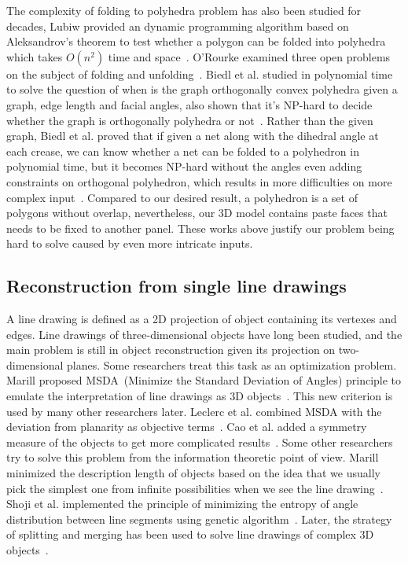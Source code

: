 The complexity of folding to polyhedra problem has also been studied for decades, Lubiw provided an dynamic programming algorithm based on Aleksandrov's theorem to test whether a polygon can be folded into polyhedra which takes $O(n^2)$ time and space~\cite{Lubiw1996When}. 
O'Rourke examined three open problems on the subject of folding and unfolding~\cite{O'Rourke:1998:FUC:646319.686376}. 
Biedl et al. studied in polynomial time to solve the question of when is the graph orthogonally convex polyhedra given a graph, edge length and facial angles, also shown that it's NP-hard to decide whether the graph is orthogonally polyhedra or not~\cite{Biedl2004When}. Rather than the given graph, Biedl et al. proved that if given a net along with the dihedral angle at each crease, we can know whether a net can be folded to a polyhedron in polynomial time, but it becomes NP-hard without the angles even adding constraints on orthogonal polyhedron, which results in more difficulties on more complex input~\cite{Biedl:2005:NFP:1090462.1646553}.
Compared to our desired result, a polyhedron is a set of polygons without overlap, nevertheless, our 3D model contains paste faces that needs to be fixed to another panel. 
These works above justify our problem being hard to solve caused by even more intricate inputs.

\subsection{Reconstruction from single line drawings} 
A line drawing is defined as a 2D projection of object containing its vertexes and edges. Line drawings of three-dimensional objects have long been studied, and the main problem is still in object reconstruction given its projection on two-dimensional planes. 
Some researchers treat this task as an optimization problem. 
Marill proposed MSDA~(Minimize the Standard Deviation of Angles) principle to emulate the interpretation of line drawings as 3D objects~\cite{Marill:1991:EHI:113057.113061}. 
This new criterion is used by many other researchers later. 
Leclerc et al. combined MSDA with the deviation from planarity as objective terms~\cite{Leclerc1992An}. 
Cao et al. added a symmetry measure of the objects to get more complicated results~\cite{Cao:2005:ORS:1097114.1097658}. 
Some other researchers try to solve this problem from the information theoretic point of view. 
Marill minimized the description length of objects based on the idea that we usually pick the simplest one from infinite possibilities when we see the line drawing~\cite{Marill1992Why}. 
Shoji et al. implemented the principle of minimizing the entropy of angle distribution between line segments using genetic algorithm~\cite{Shoji20013}. Later, the strategy of splitting and merging has been used to solve line drawings of complex 3D objects~\cite{10.1109/TPAMI.2010.49,10.1109/CVPR.2014.94}.   
		 
